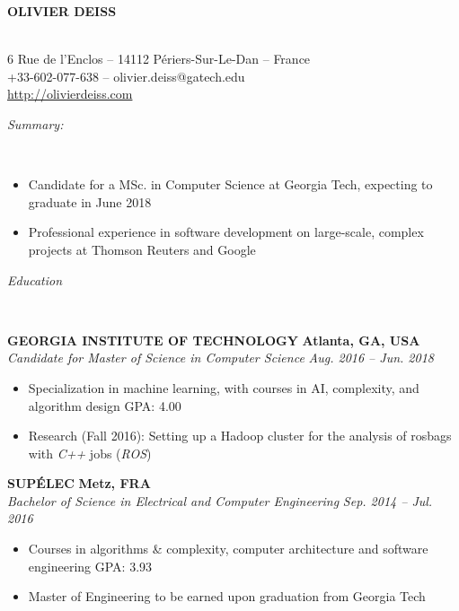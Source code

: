 \documentclass[a4paper, 12pt]{article}
\newcommand{\marginline}{-0.3cm}
\newcommand{\margincontent}{-0.6cm}
\newcommand{\marginsummary}{-0.3cm}
\newcommand{\marginbeforesection}{0.45cm}
\newcommand{\marginaftersummary}{0.2cm}
\newcommand{\linewidthperso}{0.02cm}
\newcommand{\styletitle}[1]{\textbf{#1}}
\newcommand{\styledesc}[1]{\textit{#1}}
\newcommand{\styleloc}[1]{\textbf{#1}}
\newcommand{\styledates}[1]{\textit{#1}}
\newcommand{\stylesummary}[1]{
  \vspace{\marginbeforesection}
  \begin{normalsize}\textit{#1}\end{normalsize}
  \vspace{\marginline}\\

}
\newcommand{\stylesection}[1]{
  \vspace{\marginbeforesection}
  \begin{normalsize}\textit{#1}\end{normalsize}
  \vspace{\marginline}\\
  \noindent\makebox[\linewidth]{\rule{\textwidth}{\linewidthperso}}

}
\begin{document}
\begin{footnotesize}

\begin{center}
  \begin{small}\textbf{OLIVIER DEISS}\end{small}\\
  6 Rue de l'Enclos -- 14112 P\'eriers-Sur-Le-Dan -- France\\
  +33-602-077-638 -- olivier.deiss@gatech.edu\\
  \url{http://olivierdeiss.com}
\end{center}

\stylesummary{Summary:}

\vspace{\marginsummary}
\begin{itemize}
  \item Candidate for a MSc. in Computer Science at Georgia Tech, expecting to graduate in June 2018
  \item Professional experience in software development on large-scale, complex projects at Thomson Reuters and Google
\end{itemize}
\vspace{\marginaftersummary}

\stylesection{Education}

\styletitle{GEORGIA INSTITUTE OF TECHNOLOGY} \hfill \styleloc{Atlanta, GA, USA}\\
\styledesc{Candidate for Master of Science in Computer Science} \hfill \styledates{Aug. 2016 -- Jun. 2018}\\
\vspace{\margincontent}
\begin{itemize}
  \item Specialization in machine learning, with courses in AI, complexity, and algorithm design \hfill GPA: 4.00
  \item Research (Fall 2016): Setting up a Hadoop cluster for the analysis of rosbags with \textit{C++} jobs (\textit{ROS})
\end{itemize}

\styletitle{SUP\'ELEC} \hfill \styleloc{Metz, FRA}\\
\styledesc{Bachelor of Science in Electrical and Computer Engineering} \hfill \styledates{Sep. 2014 -- Jul. 2016}\\
\vspace{\margincontent}
\begin{itemize}
  \item Courses in algorithms \& complexity, computer architecture and software engineering \hfill GPA: 3.93
  \item Master of Engineering to be earned upon graduation from Georgia Tech
\end{itemize}


\end{footnotesize}
\end{document}
